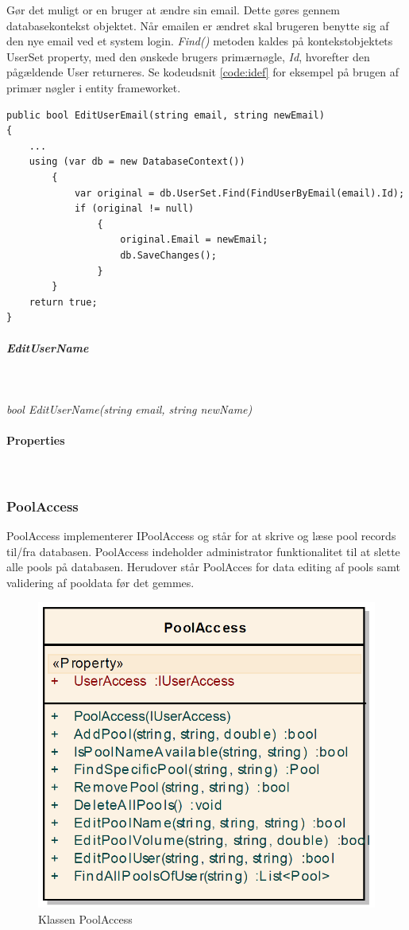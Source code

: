 Gør det muligt or en bruger at ændre sin email. Dette gøres gennem databasekontekst objektet. Når emailen er ændret skal brugeren benytte sig af den nye email ved et system login. \textit{Find()} metoden kaldes på kontekstobjektets UserSet property, med den ønskede brugers primærnøgle, \textit{Id}, hvorefter den pågældende User returneres. Se kodeudsnit \ref{code:idef} for eksempel på brugen af primær nøgler i entity frameworket.

\begin{lstlisting}[caption=EditUserEmail - brug af primær nøgler i Entity Framework,label=code:idef]
public bool EditUserEmail(string email, string newEmail)
{
	...
	using (var db = new DatabaseContext())
		{
			var original = db.UserSet.Find(FindUserByEmail(email).Id);
			if (original != null)
				{
					original.Email = newEmail;
					db.SaveChanges();
				}
		}
	return true;
}

\end{lstlisting}

\subparagraph{EditUserName}\

\textit{bool EditUserName(string email, string newName)}

\paragraph{Properties}\


\subsubsection{PoolAccess}
PoolAccess implementerer IPoolAccess og står for at skrive og læse pool records til/fra databasen. PoolAccess indeholder administrator funktionalitet til at slette alle pools på databasen. Herudover står PoolAcces for data editing af pools samt validering af pooldata før det gemmes.

\begin{figure}
\centering
\includegraphics[width=0.5\linewidth]{figs/implementering/poolAccessClass.PNG}
\caption{Klassen PoolAccess}
\label{fig:poolAccessClass}
\end{figure}

